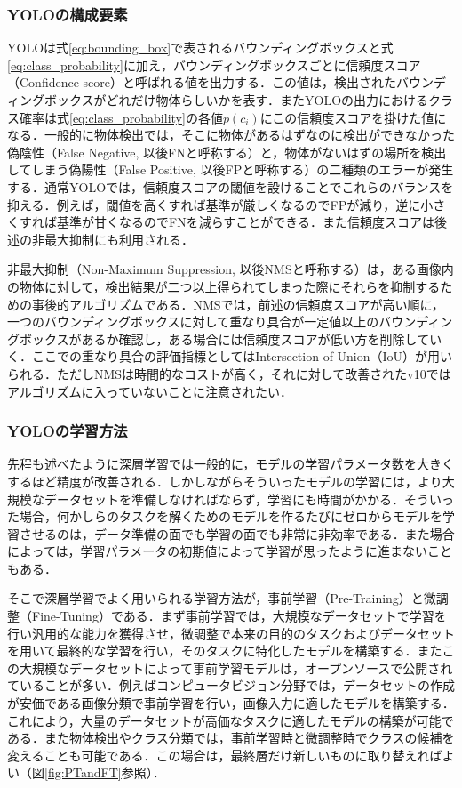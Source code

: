         \subsubsection{YOLOの構成要素}
        \label{subsubsec:yolo_components}

        YOLOは式\ref{eq:bounding_box}で表されるバウンディングボックスと式\ref{eq:class_probability}に加え，バウンディングボックスごとに信頼度スコア（Confidence score）と呼ばれる値を出力する．この値は，検出されたバウンディングボックスがどれだけ物体らしいかを表す．またYOLOの出力におけるクラス確率は式\ref{eq:class_probability}の各値$p(c_i)$にこの信頼度スコアを掛けた値になる．一般的に物体検出では，そこに物体があるはずなのに検出ができなかった偽陰性（False Negative, 以後FNと呼称する）と，物体がないはずの場所を検出してしまう偽陽性（False Positive, 以後FPと呼称する）の二種類のエラーが発生する．通常YOLOでは，信頼度スコアの閾値を設けることでこれらのバランスを抑える．例えば，閾値を高くすれば基準が厳しくなるのでFPが減り，逆に小さくすれば基準が甘くなるのでFNを減らすことができる．また信頼度スコアは後述の非最大抑制にも利用される．

        非最大抑制（Non-Maximum Suppression, 以後NMSと呼称する）は，ある画像内の物体に対して，検出結果が二つ以上得られてしまった際にそれらを抑制するための事後的アルゴリズムである．NMSでは，前述の信頼度スコアが高い順に，一つのバウンディングボックスに対して重なり具合が一定値以上のバウンディングボックスがあるか確認し，ある場合には信頼度スコアが低い方を削除していく．ここでの重なり具合の評価指標としてはIntersection of Union（IoU）が用いられる．ただしNMSは時間的なコストが高く，それに対して改善されたv10ではアルゴリズムに入っていないことに注意されたい．

        \subsubsection{YOLOの学習方法}

        先程も述べたように深層学習では一般的に，モデルの学習パラメータ数を大きくするほど精度が改善される．しかしながらそういったモデルの学習には，より大規模なデータセットを準備しなければならず，学習にも時間がかかる．そういった場合，何かしらのタスクを解くためのモデルを作るたびにゼロからモデルを学習させるのは，データ準備の面でも学習の面でも非常に非効率である．また場合によっては，学習パラメータの初期値によって学習が思ったように進まないこともある．

        そこで深層学習でよく用いられる学習方法が，事前学習（Pre-Training）と微調整（Fine-Tuning）である\cite{radford2018improving}．まず事前学習では，大規模なデータセットで学習を行い汎用的な能力を獲得させ，微調整で本来の目的のタスクおよびデータセットを用いて最終的な学習を行い，そのタスクに特化したモデルを構築する．またこの大規模なデータセットによって事前学習モデルは，オープンソースで公開されていることが多い．例えばコンピュータビジョン分野では，データセットの作成が安価である画像分類で事前学習を行い，画像入力に適したモデルを構築する．これにより，大量のデータセットが高価なタスクに適したモデルの構築が可能である．また物体検出やクラス分類では，事前学習時と微調整時でクラスの候補を変えることも可能である．この場合は，最終層だけ新しいものに取り替えればよい（図\ref{fig:PTandFT}参照）．

